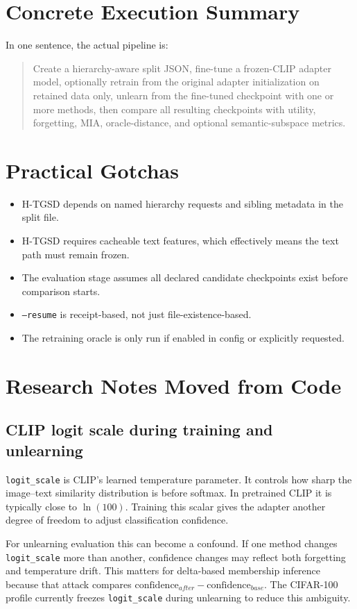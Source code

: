 \documentclass[10pt,a4paper]{article}
\begin{document}
\section{Concrete Execution Summary}
In one sentence, the actual pipeline is:

\begin{quote}
Create a hierarchy-aware split JSON, fine-tune a frozen-CLIP adapter model, optionally retrain from the original adapter initialization on retained data only, unlearn from the fine-tuned checkpoint with one or more methods, then compare all resulting checkpoints with utility, forgetting, MIA, oracle-distance, and optional semantic-subspace metrics.
\end{quote}

\section{Practical Gotchas}
\begin{itemize}
  \item H-TGSD depends on named hierarchy requests and sibling metadata in the split file.
  \item H-TGSD requires cacheable text features, which effectively means the text path must remain frozen.
  \item The evaluation stage assumes all declared candidate checkpoints exist before comparison starts.
  \item \texttt{--resume} is receipt-based, not just file-existence-based.
  \item The retraining oracle is only run if enabled in config or explicitly requested.
\end{itemize}

\section{Research Notes Moved from Code}
\subsection{CLIP logit scale during training and unlearning}
\texttt{logit\_scale} is CLIP's learned temperature parameter. It controls how sharp the image--text similarity distribution is before softmax. In pretrained CLIP it is typically close to \(\ln(100)\). Training this scalar gives the adapter another degree of freedom to adjust classification confidence.

For unlearning evaluation this can become a confound. If one method changes \texttt{logit\_scale} more than another, confidence changes may reflect both forgetting and temperature drift. This matters for delta-based membership inference because that attack compares \(\text{confidence}_{after} - \text{confidence}_{base}\). The CIFAR-100 profile currently freezes \texttt{logit\_scale} during unlearning to reduce this ambiguity.
\end{document}
